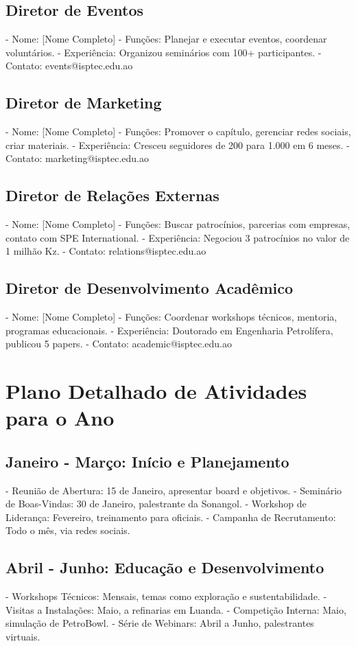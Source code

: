 \documentclass[12pt]{article}
\begin{document}
\subsection{Diretor de Eventos}
- Nome: [Nome Completo]
- Funções: Planejar e executar eventos, coordenar voluntários.
- Experiência: Organizou seminários com 100+ participantes.
- Contato: events@isptec.edu.ao

\subsection{Diretor de Marketing}
- Nome: [Nome Completo]
- Funções: Promover o capítulo, gerenciar redes sociais, criar materiais.
- Experiência: Cresceu seguidores de 200 para 1.000 em 6 meses.
- Contato: marketing@isptec.edu.ao

\subsection{Diretor de Relações Externas}
- Nome: [Nome Completo]
- Funções: Buscar patrocínios, parcerias com empresas, contato com SPE International.
- Experiência: Negociou 3 patrocínios no valor de 1 milhão Kz.
- Contato: relations@isptec.edu.ao

\subsection{Diretor de Desenvolvimento Acadêmico}
- Nome: [Nome Completo]
- Funções: Coordenar workshops técnicos, mentoria, programas educacionais.
- Experiência: Doutorado em Engenharia Petrolífera, publicou 5 papers.
- Contato: academic@isptec.edu.ao

\section{Plano Detalhado de Atividades para o Ano}

\subsection{Janeiro - Março: Início e Planejamento}
- Reunião de Abertura: 15 de Janeiro, apresentar board e objetivos.
- Seminário de Boas-Vindas: 30 de Janeiro, palestrante da Sonangol.
- Workshop de Liderança: Fevereiro, treinamento para oficiais.
- Campanha de Recrutamento: Todo o mês, via redes sociais.

\subsection{Abril - Junho: Educação e Desenvolvimento}
- Workshops Técnicos: Mensais, temas como exploração e sustentabilidade.
- Visitas a Instalações: Maio, a refinarias em Luanda.
- Competição Interna: Maio, simulação de PetroBowl.
- Série de Webinars: Abril a Junho, palestrantes virtuais.
\end{document}
